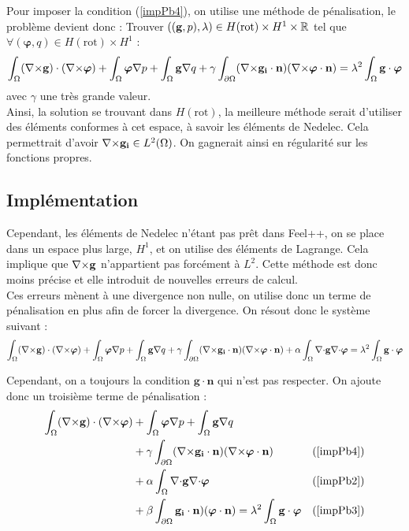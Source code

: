 Pour imposer la condition (\ref{impPb4}), on utilise une méthode de pénalisation, le problème devient donc :
Trouver $((\mathbf{g},p),\lambda)\in H(\mathrm{rot}) \times H^1 \times {\mathbb{R}}$ tel que $\forall (\bm{\varphi},q)\in H(\mathrm{rot}) \times H^1$ :
\begin{equation}\label{impFvEigen}
\int_\Omega ({\nabla\times}\mathbf{g})\cdot({\nabla\times}\bm{\varphi}) + \int_\Omega\bm{\varphi}{\nabla} p + \int_\Omega \mathbf{g}{\nabla} q + \gamma\int_{\partial\Omega}({\nabla\times}\mathbf{g_i}\cdot\mathbf{n})({\nabla\times}\bm{\varphi}\cdot\mathbf{n}) = \lambda^2\int_\Omega \mathbf{g}\cdot\bm{\varphi}
\end{equation}
avec $\gamma$ une très grande valeur.\\

Ainsi, la solution se trouvant dans $H(\mathrm{rot})$, la meilleure méthode serait d'utiliser des éléments conformes à cet espace, à savoir les éléments de Nedelec. Cela permettrait d'avoir ${\nabla\times}\mathbf{g_i}\in L^2(\Omega)$. On gagnerait ainsi en régularité sur les fonctions propres.

\subsection{Implémentation}

Cependant, les éléments de Nedelec n'étant pas prêt dans Feel++, on se place dans un espace plus large, $H^1$, et on utilise des éléments de Lagrange. Cela implique que ${\nabla\times}\mathbf{g}$ n'appartient pas forcément à $L^2$. Cette méthode est donc moins précise et elle introduit de nouvelles erreurs de calcul.\\

Ces erreurs mènent à une divergence non nulle, on utilise donc un terme de pénalisation en plus afin de forcer la divergence. On résout donc le système suivant :
\[ \int_\Omega ({\nabla\times}\mathbf{g})\cdot({\nabla\times}\bm{\varphi}) + \int_\Omega\bm{\varphi}{\nabla} p + \int_\Omega \mathbf{g}{\nabla} q + \gamma\int_{\partial\Omega}({\nabla\times}\mathbf{g_i}\cdot\mathbf{n})({\nabla\times}\bm{\varphi}\cdot\mathbf{n}) + \alpha\int_\Omega {\nabla\cdot}\mathbf{g}{\nabla\cdot}\bm{\varphi} = \lambda^2\int_\Omega \mathbf{g}\cdot\bm{\varphi} \]

Cependant, on a toujours la condition $\mathbf{g}\cdot\mathbf{n}$ qui n'est pas respecter. On ajoute donc un troisième terme de pénalisation :
\begin{align*}
\int_\Omega ({\nabla\times}\mathbf{g})\cdot({\nabla\times}\bm{\varphi}) &+ \int_\Omega\bm{\varphi}{\nabla} p + \int_\Omega \mathbf{g}{\nabla} q & \\
&+ \gamma\int_{\partial\Omega}({\nabla\times}\mathbf{g_i}\cdot\mathbf{n})({\nabla\times}\bm{\varphi}\cdot\mathbf{n}) & (\ref{impPb4})\\
& + \alpha\int_\Omega {\nabla\cdot}\mathbf{g}{\nabla\cdot}\bm{\varphi} & (\ref{impPb2})\\
&+ \beta\int_{\partial\Omega}\mathbf{g_i}\cdot\mathbf{n})(\bm{\varphi}\cdot\mathbf{n})  = \lambda^2\int_\Omega \mathbf{g}\cdot\bm{\varphi} & (\ref{impPb3})
\end{align*}

